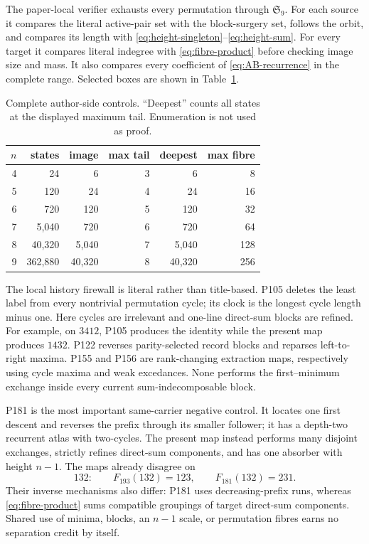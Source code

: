 \documentclass[a4paper,10pt]{amsart}
\theoremstyle{definition}
\theoremstyle{remark}
\begin{document}
The paper-local verifier exhausts every permutation through
$\mathfrak S_9$.  For each source it compares the literal active-pair set
with the block-surgery set, follows the orbit, and compares its length with
\eqref{eq:height-singleton}--\eqref{eq:height-sum}.  For every target it
compares literal indegree with \eqref{eq:fibre-product} before checking image
size and mass.  It also compares every coefficient of
\eqref{eq:AB-recurrence} in the complete range.  Selected boxes are shown in
Table~\ref{tab:controls}.

\begin{table}[ht]
\centering
\small
\begin{tabular}{rrrrrr}
\toprule
$n$ & states & image & max tail & deepest & max fibre\\
\midrule
4 & 24 & 6 & 3 & 6 & 8\\
5 & 120 & 24 & 4 & 24 & 16\\
6 & 720 & 120 & 5 & 120 & 32\\
7 & 5,040 & 720 & 6 & 720 & 64\\
8 & 40,320 & 5,040 & 7 & 5,040 & 128\\
9 & 362,880 & 40,320 & 8 & 40,320 & 256\\
\bottomrule
\end{tabular}
\caption{Complete author-side controls.  ``Deepest'' counts all states at
the displayed maximum tail.  Enumeration is not used as proof.}
\label{tab:controls}
\end{table}

The local history firewall is literal rather than title-based.  P105 deletes
the least label from every nontrivial permutation cycle; its clock is the
longest cycle length minus one.  Here cycles are irrelevant and one-line
direct-sum blocks are refined.  For example, on $3412$, P105 produces the
identity while the present map produces $1432$.  P122 reverses parity-selected
record blocks and reparses left-to-right maxima.  P155 and P156 are
rank-changing extraction maps, respectively using cycle maxima and weak
excedances.  None performs the first--minimum exchange inside every current
sum-indecomposable block.

P181 is the most important same-carrier negative control.  It locates one
first descent and reverses the prefix through its smaller follower; it has a
depth-two recurrent atlas with two-cycles.  The present map instead performs
many disjoint exchanges, strictly refines direct-sum components, and has one
absorber with height $n-1$.  The maps already disagree on
\[
 132:\qquad F_{193}(132)=123,
 \qquad F_{181}(132)=231.
\]
Their inverse mechanisms also differ: P181 uses decreasing-prefix runs,
whereas \eqref{eq:fibre-product} sums compatible groupings of target
direct-sum components.  Shared use of minima, blocks, an $n-1$ scale, or
permutation fibres earns no separation credit by itself.
\end{document}
